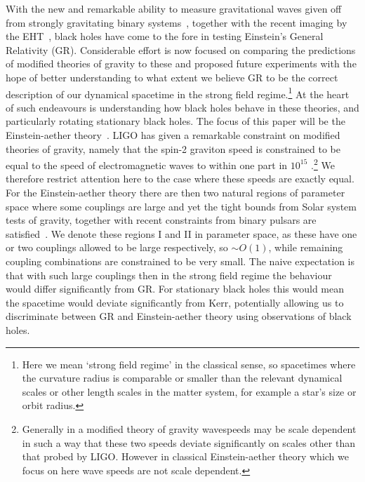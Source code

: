 \documentclass[12pt]{article}
\numberwithin{equation}{section}
\begin{document}
With the new and remarkable ability to measure gravitational waves given off from strongly gravitating binary systems~\cite{LIGOScientific:2016aoc}, together with the recent imaging by the EHT~\cite{EventHorizonTelescope:2019dse}, black holes have come to the fore in testing Einstein's General Relativity (GR). Considerable effort is now focused on comparing the predictions of modified theories of gravity to these and proposed future experiments with the hope of better understanding to what extent we believe GR to be the correct description of our dynamical spacetime in the strong field regime.\footnote{Here we mean `strong field regime' in the classical sense, so spacetimes where the curvature radius is comparable or smaller than the relevant dynamical scales or other length scales in the matter system, for example a star's size or orbit radius.}
%
At the heart of such endeavours is understanding how black holes behave in these theories, and particularly rotating stationary black holes.
The focus of this paper will be the Einstein-aether theory~\cite{Jacobson:2004ts}.
LIGO has given a remarkable constraint on modified theories of gravity, namely that the spin-2 graviton speed is constrained to be equal to the speed of electromagnetic waves to within one part in $10^{15}$ \cite{TheLIGOScientific:2017qsa,Creminelli:2017sry}.\footnote{Generally in a modified theory of gravity wavespeeds may be scale dependent in such a way that these two speeds deviate significantly on scales other than that probed by LIGO\cite{deRham:2018red}. However in classical Einstein-aether theory which we focus on here wave speeds are not scale dependent.} We therefore restrict attention here to the case where these speeds are exactly equal.
For the Einstein-aether theory there are then two natural regions of parameter space where some couplings are large and yet the tight bounds from Solar system tests of gravity, together with recent constraints from binary pulsars are satisfied~\cite{Oost:2018tcv,Gupta:2021vdj}. We denote these regions I and II in parameter space, as these have one or two couplings allowed to be large respectively, so $\sim O(1)$, while remaining coupling combinations are constrained to be very small. The naive expectation is that with such large couplings then in the strong field regime 
 the behaviour would differ significantly from GR. For stationary black holes this would mean the spacetime would deviate significantly from Kerr, potentially allowing us to discriminate between GR and Einstein-aether theory using observations of black holes.
\end{document}
